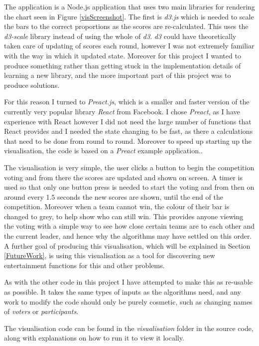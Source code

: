 \documentclass[12pt]{report}
\begin{document}
The application is a Node.js application that uses two main libraries for rendering the chart seen in Figure \ref{visScreenshot}. The first is \textit{d3.js} which is needed to scale the bars to the correct proportions as the scores are re-calculated. This uses the \textit{d3-scale} library\cite{d3} instead of using the whole of \textit{d3}. \textit{d3} could have theoretically taken care of updating of scores each round, however I was not extremely familiar with the way in which it updated state. Moreover for this project I wanted to produce something rather than getting stuck in the implementation details of learning a new library, and the more important part of this project was to produce solutions.

For this reason I turned to \textit{Preact.js}\cite{Preact}, which is a smaller and faster version of the currently very popular library \textit{React}\cite{React} from Facebook. I chose \textit{Preact}, as I have experience with React however I did not need the large number of functions that React provides and I needed the state changing to be fast, as there a calculations that need to be done from round to round. Moreover to speed up starting up the visualisation, the code is based on a \textit{Preact} example application.\cite{PreactBoilerplate}.

The visualisation is very simple, the user clicks a button to begin the competition voting and from there the scores are updated and shown on screen. A timer is used so that only one button press is needed to start the voting and from then on around every 1.5 seconds the new scores are shown, until the end of the competition. Moreover when a team cannot win, the colour of their bar is changed to grey, to help show who can still win. This provides anyone viewing the voting with a simple way to see how close certain teams are to each other and the current leader, and hence why the algorithms may have settled on this order. A further goal of producing this visualisation, which will be explained in Section \ref{FutureWork}, is using this visualisation as a tool for discovering new entertainment functions for this and other problems. 

As with the other code in this project I have attempted to make this as re-usable as possible. It takes the same types of inputs as the algorithms need, and any work to modify the code should only be purely cosmetic, such as changing names of \textit{voters} or \textit{participants}.

The visualisation code can be found in the \textit{visualisation} folder in the source code, along with explanations on how to run it to view it locally.
\end{document}
